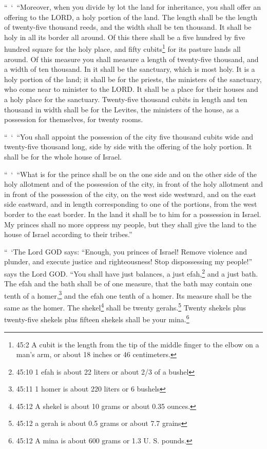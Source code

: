 \mychapter{} \myverse*{}“ ‘ “Moreover, when you divide by lot the land for inheritance,
you shall offer an offering to the LORD, a holy portion of the land. The length shall be the length of
twenty-five thousand reeds, and the width shall be ten thousand. It shall be holy in all its border all
around.
\myverse{}Of this there shall be a five hundred by five hundred square for the holy place,
and fifty cubits\footnote{45:2 A cubit is the length from the tip of the middle finger to the elbow on a man’s arm, or about
	18 inches or 46 centimeters.} for its pasture lands all around.
\myverse{}Of this measure you shall measure a length of twenty-five thousand, and a width
of ten thousand. In it shall be the sanctuary, which is most holy.
\myverse{}It is a holy portion of the land; it shall be for the priests, the ministers
of the sanctuary, who come near to minister to the LORD. It shall be a place for their houses and a holy
place for the sanctuary.
\myverse{}Twenty-five thousand cubits in length and ten thousand in width shall be for
the Levites, the ministers of the house, as a possession for themselves, for twenty rooms.

\myverse{}“ ‘ “You shall appoint the possession of the city five thousand
cubits wide and twenty-five thousand long, side by side with the offering of the holy portion. It shall
be for the whole house of Israel.

\myverse{}“ ‘ “What is for the prince shall be on the one side and on the
other side of the holy allotment and of the possession of the city, in front of the holy allotment and
in front of the possession of the city, on the west side westward, and on the east side eastward, and
in length corresponding to one of the portions, from the west border to the east border.
\myverse{}In the land it shall be to him for a possession in Israel. My princes shall
no more oppress my people, but they shall give the land to the house of Israel according to their tribes.”

\myverse{}“ ‘The Lord GOD says: “Enough, you princes of Israel! Remove violence
and plunder, and execute justice and righteousness! Stop dispossessing my people!” says the Lord GOD.
\myverse{}“You shall have just balances, a just efah,\footnote{45:10 1 efah is about 22 liters or about 2/3 of a bushel} and a just bath.
\myverse{}The efah and the bath shall be of one measure, that the bath may contain
one tenth of a homer,\footnote{45:11 1 homer is about 220 liters or 6 bushels} and the efah one tenth of a homer. Its measure
shall be the same as the homer.
\myverse{}The shekel\footnote{45:12 A shekel is about 10 grams or about 0.35 ounces.} shall be twenty gerahs.\footnote{45:12 a gerah is about 0.5 grams or about 7.7 grains} Twenty shekels plus twenty-five shekels
plus fifteen shekels shall be your mina.\footnote{45:12 A mina is about 600 grams or 1.3 U. S. pounds.}

